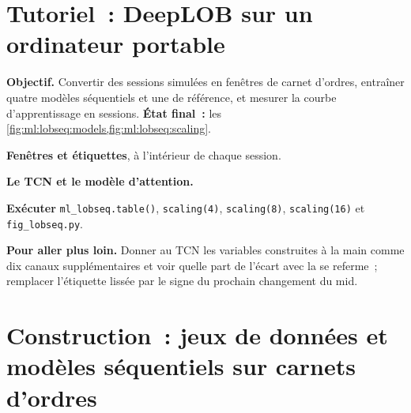 \section{Tutoriel~: DeepLOB sur un ordinateur portable}\label{tut:ml:sequence-models-on-order-books:tut}

\begin{tutorial}
\textbf{Objectif.} Convertir des sessions simulées en fenêtres de carnet d'ordres, entraîner quatre modèles séquentiels et une  de référence, et
mesurer la courbe d'apprentissage en sessions. \textbf{État final~:} les \cref{fig:ml:lobseq:models,fig:ml:lobseq:scaling}.
\begin{tutsteps}
\item \textbf{Fenêtres et étiquettes}, à l'intérieur de chaque session.
\label{lst:ml:lobseq:windows}
\item \textbf{Le TCN et le modèle d'attention.}
\label{lst:ml:lobseq:models}
\item \textbf{Exécuter} \texttt{ml\_lobseq.table()}, \texttt{scaling(4)}, \texttt{scaling(8)}, \texttt{scaling(16)} et
\texttt{fig\_lobseq.py}.
\end{tutsteps}
\textbf{Pour aller plus loin.} Donner au TCN les variables construites à la main comme dix canaux supplémentaires et voir quelle part de l'écart avec la
 se referme~; remplacer l'étiquette lissée par le signe du prochain changement du mid.
\end{tutorial}

\section{Construction~: jeux de données et modèles séquentiels sur carnets d'ordres}\label{bld:ml:sequence-models-on-order-books:lobseq}

